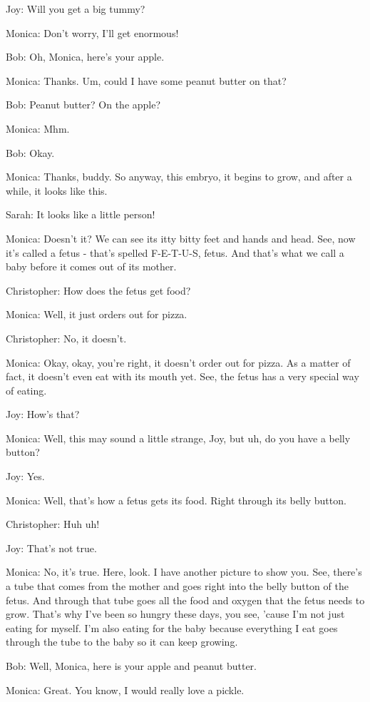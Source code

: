 Joy: Will you get a big tummy?

Monica: Don't worry, I'll get enormous!

Bob: Oh, Monica, here's your apple.

Monica: Thanks. Um, could I have some peanut butter on that?

Bob: Peanut butter? On the apple?

Monica: Mhm.

Bob: Okay.

Monica: Thanks, buddy. So anyway, this embryo, it begins to grow, and after a while, it looks like this.

Sarah: It looks like a little person!

Monica: Doesn't it? We can see its itty bitty feet and hands and head. See, now it's called a fetus - that's spelled F-E-T-U-S, fetus. And that's what we call a baby before it comes out of its mother.

Christopher: How does the fetus get food?

Monica: Well, it just orders out for pizza.

Christopher: No, it doesn't.

Monica: Okay, okay, you're right, it doesn't order out for pizza. As a matter of fact, it doesn't even eat with its mouth yet. See, the fetus has a very special way of eating.

Joy: How's that?

Monica: Well, this may sound a little strange, Joy, but uh, do you have a belly button?

Joy: Yes.

Monica: Well, that's how a fetus gets its food. Right through its belly button.

Christopher: Huh uh!

Joy: That's not true.

Monica: No, it's true. Here, look. I have another picture to show you. See, there's a tube that comes from the mother and goes right into the belly button of the fetus. And through that tube goes all the food and oxygen that the fetus needs to grow. That's why I've been so hungry these days, you see, 'cause I'm not just eating for myself. I'm also eating for the baby because everything I eat goes through the tube to the baby so it can keep growing.

Bob: Well, Monica, here is your apple and peanut butter.

Monica: Great. You know, I would really love a pickle.

